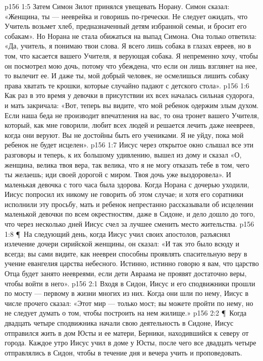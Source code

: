 \vs p156 1:5 Затем Симон Зилот принялся увещевать Норану. Симон сказал: «Женщина, ты --- нееврейка и говоришь по\hyp{}гречески. Не следует ожидать, что Учитель возьмет хлеб, предназначенный детям избранной семьи, и бросит его собакам». Но Норана не стала обижаться на выпад Симона. Она только ответила: «Да, учитель, я понимаю твои слова. Я всего лишь собака в глазах евреев, но в том, что касается вашего Учителя, я верующая собака. Я непременно хочу, чтобы он посмотрел мою дочь, потому что убеждена, что если он лишь взглянет на нее, то вылечит ее. И даже ты, мой добрый человек, не осмелишься лишить собаку права хватать те крошки, которые случайно падают с детского стола».
\vs p156 1:6 Как раз в это время у девочки в присутствии их всех началась сильная судорога, и мать закричала: «Вот, теперь вы видите, что мой ребенок одержим злым духом. Если наша беда не производит впечатления на вас, то она тронет вашего Учителя, который, как мне говорили, любит всех людей и решается лечить даже неевреев, когда они веруют. Вы не достойны быть его учениками. Я не уйду, пока мой ребенок не будет исцелен».
\vs p156 1:7 Иисус через открытое окно слышал все эти разговоры и теперь, к их большому удивлению, вышел из дому и сказал «О, женщина, велика твоя вера, так велика, что я не могу отказать тебе в том, чего ты желаешь; иди своей дорогой с миром. Твоя дочь уже выздоровела». И маленькая девочка с того часа была здорова. Когда Норана с дочерью уходили, Иисус попросил их никому не говорить об этом случае; и хотя его соратники исполнили эту просьбу, мать и ребенок непрестанно рассказывали об исцелении маленькой девочки по всем окрестностям, даже в Сидоне, и дело дошло до того, что через несколько дней Иисус счел за лучшее сменить место жительства.
\vs p156 1:8 \P\ На следующий день, когда Иисус учил своих апостолов, разъяснял излечение дочери сирийской женщины, он сказал: «И так это было всюду и всегда; вы сами видите, как неевреи способны проявлять спасительную веру в учение евангелия царства небесного. Истинно, истинно говорю я вам, что царство Отца будет занято неевреями, если дети Авраама не проявят достаточно веры, чтобы войти в него».
\vs p156 2:1 Входя в Сидон, Иисус и его сподвижники прошли по мосту --- первому в жизни многих из них. Когда они шли по нему, Иисус в числе прочего сказал: «Этот мир --- только мост; вы можете пройти по нему, но не следует думать о том, чтобы построить на нем жилище.»
\vs p156 2:2 \P\ Когда двадцать четыре сподвижника начали свою деятельность в Сидоне, Иисус отправился жить в дом Юсты и ее матери, Берники, находившийся к северу от города. Каждое утро Иисус учил в доме у Юсты, после чего все двадцать четыре отправлялись в Сидон, чтобы в течение дня и вечера учить и проповедовать.
